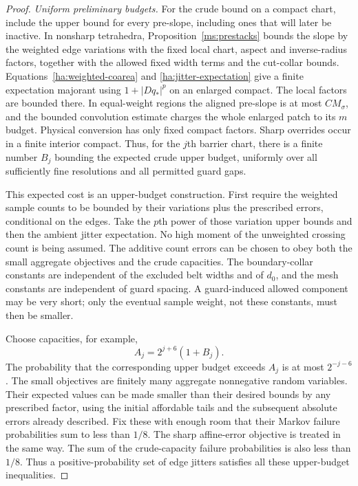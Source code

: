 \documentclass[11pt]{article}
\numberwithin{equation}{section}
\theoremstyle{definition}
\theoremstyle{remark}
\begin{document}
\begin{proof}
\emph{Uniform preliminary budgets.}
For the crude bound on a compact chart, include the upper bound for
every pre-slope, including ones that will later be inactive.
In nonsharp tetrahedra,
Proposition~\ref{ms:prestacks} bounds the slope by the weighted edge
variations with the fixed local chart, aspect and inverse-radius
factors, together with the allowed fixed width terms and the
cut-collar bounds.  Equations~\eqref{ha:weighted-coarea} and
\eqref{ha:jitter-expectation} give a finite expectation majorant
using $1+|Dq_*|^p$ on an enlarged compact.  The local factors are
bounded there.  In equal-weight regions the aligned pre-slope is
at most $CM_\sigma$, and the bounded convolution estimate charges
the whole enlarged patch to its $m$ budget.  Physical conversion
has only fixed compact factors.  Sharp overrides occur in a finite
interior compact.  Thus, for the $j$th barrier chart, there is a
finite number $B_j$ bounding the expected crude upper budget, uniformly
over all sufficiently fine resolutions and all permitted guard
gaps.

This expected cost is an upper-budget construction.  First require
the weighted sample counts to be bounded by their variations plus
the prescribed errors, conditional on the edges.  Take the $p$th
power of those variation upper bounds and then the ambient jitter
expectation.  No high moment of the unweighted crossing count is
being assumed.  The additive count errors can be chosen to obey
both the small aggregate objectives and the crude capacities.
The boundary-collar constants are independent of the excluded belt
widths and of $d_0$, and the mesh constants are independent of guard
spacing.  A guard-induced allowed component may be very short;
only the eventual sample weight, not these constants, must then
be smaller.

Choose capacities, for example,
\[
                            A_j=2^{j+6}(1+B_j).
\]
The probability that the corresponding upper budget exceeds $A_j$
is at most $2^{-j-6}$.  The small objectives are finitely many
aggregate nonnegative random variables.  Their expected values
can be made smaller than their desired bounds by any prescribed
factor, using the initial affordable tails and the subsequent
absolute errors already described.  Fix these with enough room
that their Markov failure probabilities sum to less than $1/8$.
The sharp affine-error objective is treated in the same way.
The sum of the crude-capacity failure probabilities is also less
than $1/8$.  Thus a positive-probability set of edge jitters
satisfies all these upper-budget inequalities.


\end{proof}
\end{document}
